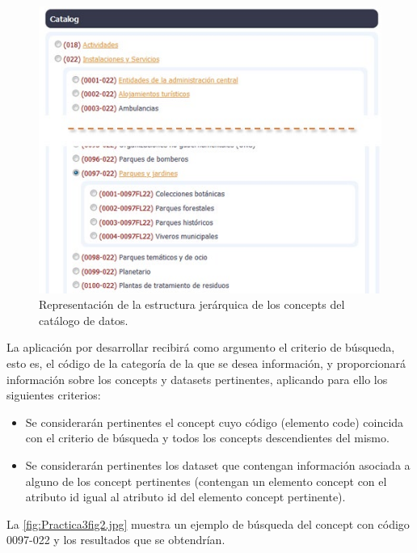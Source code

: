 \begin{figure}[H]
    \centering
    \includegraphics[width=\textwidth]{imagenes/Practica3fig1.jpg}
    \caption{Representación de la estructura jerárquica de los concepts del catálogo de datos.}
    \label{fig:Practica3fig1.jpg}
\end{figure}


La aplicación por desarrollar recibirá como argumento el criterio de búsqueda, esto es, el código de la categoría de la que se desea información, y proporcionará información sobre los concepts y datasets pertinentes, aplicando para ello los siguientes criterios:

\begin{itemize}
    \item Se considerarán pertinentes el concept cuyo código (elemento code) coincida con el criterio de búsqueda y todos los concepts descendientes del mismo.
    \item Se considerarán pertinentes los dataset que contengan información asociada a alguno de los concept pertinentes (contengan un elemento concept con el atributo id igual al atributo id del elemento concept pertinente).
\end{itemize}

La \autoref{fig:Practica3fig2.jpg} muestra un ejemplo de búsqueda del concept con código 0097-022 y los resultados que se obtendrían.

